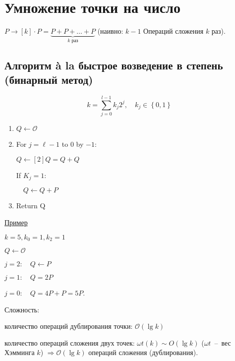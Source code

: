 \documentclass[12pt]{article}
\newcommand{\bigO}{\mathcal{O}}
\theoremstyle{definition}
\theoremstyle{definition}
\theoremstyle{definition}
\begin{document}
\section{Умножение точки на число}
    $P \to \left[ k \right] \cdot P = \underbrace {P + P +  \ldots  + P}_{k{\text{ раз}}}$ (наивно: $k-1$ Операций сложения $k$ раз).
    
    \subsection{Алгоритм à la быстрое возведение в степень (бинарный метод)}
    $$k = \sum\limits_{j = 0}^{l - 1} {{k_j}{2^j}} ,\quad {k_j} \in \left\{ {0,1} \right\}
    $$
    
    \begin{enumerate}
    	\item $Q \leftarrow \mathcal{O}$
    	
    	\item For $j = \ell - 1$ to $0$ by $-1$:
    	
    	$Q \leftarrow \left[ 2 \right]Q = Q + Q$
    	
    	If ${K_j} = 1:$
    	
    	$\quad Q \leftarrow Q + P$
    	
    	\item Return Q
    \end{enumerate}
    
    \underline{Пример}
    
    $k = 5, k_0 = 1, k_2 = 1$
    
    $Q \leftarrow \mathcal{O}$
    
    $j = 2: \quad Q \leftarrow P$
    
    $j = 1: \quad Q = 2P$
    
    $j = 0: \quad Q = 4P + P = 5P$.
    
    Сложность: 
    
    количество операций дублирования точки: $\bigO(\lg k)$
      
    количество операций сложения двух точек: $\omega t(k)\sim O (\lg k)$ ($\omega t$~--~вес Хэмминга $k$) $ \Rightarrow \bigO \left( {\lg k} \right)$ операций сложения (дублирования).
\end{document}
